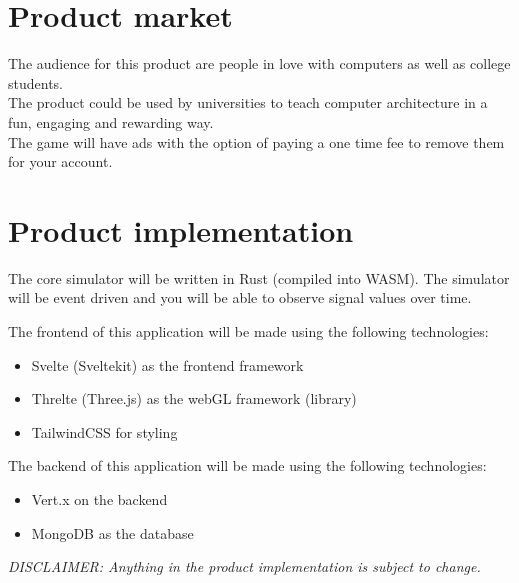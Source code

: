 \documentclass[12pt]{article}
\begin{document}
\section{Product market}
The audience for this product are people in love with computers as well as college students.\\
The product could be used by universities to teach computer architecture in a fun, engaging and rewarding way.\\
The game will have ads with the option of paying a one time fee to remove them for your account.
\section{Product implementation}

The core simulator will be written in Rust (compiled into WASM).
The simulator will be event driven and you will be able to observe signal values over time.

The frontend of this application will be made using the following technologies:
\begin{itemize}
    \item Svelte (Sveltekit) as the frontend framework
    \item Threlte (Three.js) as the webGL framework (library)
    \item TailwindCSS for styling
\end{itemize}
The backend of this application will be made using the following technologies:
\begin{itemize}
    \item Vert.x on the backend
    \item MongoDB as the database
\end{itemize}

\textit{DISCLAIMER: Anything in the product implementation is subject to change.}
\end{document}
